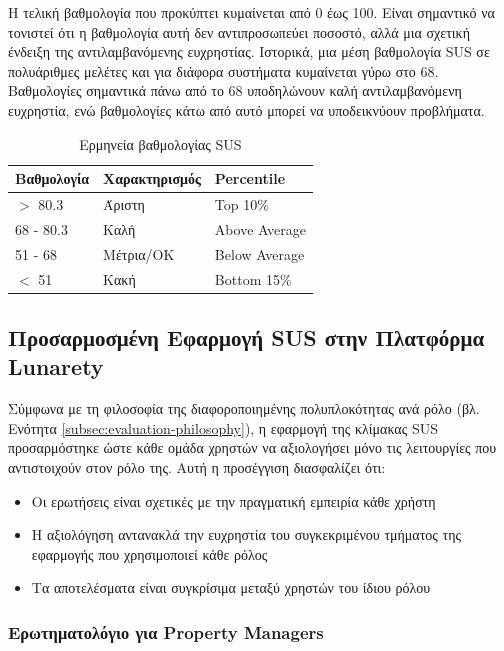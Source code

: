 \documentclass[
	12pt, %
	oneside, %
	greek,
	onehalfspacing, %
	liststotoc, %
	toctotoc, %
	parskip, %
	headsepline, %
]{MastersDoctoralThesis} %
\begin{document}
Η τελική βαθμολογία που προκύπτει κυμαίνεται από 0 έως 100. Είναι σημαντικό να τονιστεί ότι η βαθμολογία αυτή δεν αντιπροσωπεύει ποσοστό, αλλά μια σχετική ένδειξη της αντιλαμβανόμενης ευχρηστίας. Ιστορικά, μια μέση βαθμολογία SUS σε πολυάριθμες μελέτες και για διάφορα συστήματα κυμαίνεται γύρω στο 68. Βαθμολογίες σημαντικά πάνω από το 68 υποδηλώνουν καλή αντιλαμβανόμενη ευχρηστία, ενώ βαθμολογίες κάτω από αυτό μπορεί να υποδεικνύουν προβλήματα.

\begin{table}[H]
\centering
\caption{Ερμηνεία βαθμολογίας SUS}
\label{tab:sus-interpretation}
\begin{tabular}{@{}L{3cm}L{4cm}L{5cm}@{}}
\toprule
\textbf{Βαθμολογία} & \textbf{Χαρακτηρισμός} & \textbf{Percentile} \\
\midrule
$>$ 80.3 & Άριστη & Top 10\% \\
68 - 80.3 & Καλή & Above Average \\
51 - 68 & Μέτρια/OK & Below Average \\
$<$ 51 & Κακή & Bottom 15\% \\
\bottomrule
\end{tabular}
\end{table}

\subsection{Προσαρμοσμένη Εφαρμογή SUS στην Πλατφόρμα Lunarety}

Σύμφωνα με τη φιλοσοφία της διαφοροποιημένης πολυπλοκότητας ανά ρόλο (βλ. Ενότητα \ref{subsec:evaluation-philosophy}), η εφαρμογή της κλίμακας SUS προσαρμόστηκε ώστε κάθε ομάδα χρηστών να αξιολογήσει μόνο τις λειτουργίες που αντιστοιχούν στον ρόλο της. Αυτή η προσέγγιση διασφαλίζει ότι:

\begin{itemize}
    \item Οι ερωτήσεις είναι σχετικές με την πραγματική εμπειρία κάθε χρήστη
    \item Η αξιολόγηση αντανακλά την ευχρηστία του συγκεκριμένου τμήματος της εφαρμογής που χρησιμοποιεί κάθε ρόλος
    \item Τα αποτελέσματα είναι συγκρίσιμα μεταξύ χρηστών του ίδιου ρόλου
\end{itemize}

\subsubsection{Ερωτηματολόγιο για Property Managers}
\end{document}
